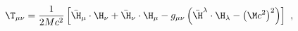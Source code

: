 \begin{equation}
  \label{eq:Tscp}
  \T_{\mu\nu}=\frac{1}{2Mc^2}\left[\bar{\H}_\mu\cdot\H_\nu+\bar{\H}_\nu\cdot\H_\mu
  -g_{\mu\nu}\left(\bar{\H}^\lambda \cdot \H_\lambda-\left(\M c^2 \right)^2 \right)\right]\ ,
\end{equation}

